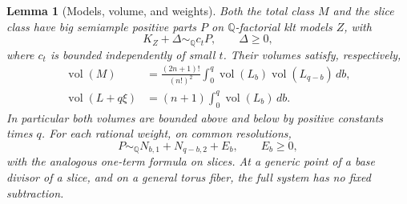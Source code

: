 \documentclass[11pt,letterpaper]{article}
\newcommand{\Q}{\mathbb{Q}}
\DeclareMathOperator{\vol}{vol}
\newtheorem{lemma}[theorem]{Lemma}
\theoremstyle{definition}
\theoremstyle{remark}
\begin{document}
\begin{lemma}[Models, volume, and weights]\label{proj:jet:bundle-models}
Both the total class \(M\) and the slice class have big semiample
positive parts \(P\) on \(\Q\)-factorial klt models \(Z\), with
\[
 K_Z+\Delta\sim_{\Q}c_tP,\qquad \Delta\ge0,
\]
where \(c_t\) is bounded independently of small \(t\).
Their volumes satisfy, respectively,
\begin{align}
 \vol(M)&=\frac{(2n+1)!}{(n!)^2}
   \int_0^q\vol(L_b)\vol(L_{q-b})\,db,\label{proj:jet:total-volume}\\
 \vol(L+q\xi)&=(n+1)\int_0^q\vol(L_b)\,db.\label{proj:jet:slice-volume}
\end{align}
In particular both volumes are bounded above and below by positive
constants times \(q\).  For each rational weight, on common
resolutions,
\begin{equation}\label{proj:jet:weight-domination}
 P\sim_{\Q}N_{b,1}+N_{q-b,2}+E_b,\qquad E_b\ge0,
\end{equation}
with the analogous one-term formula on slices.
At a generic point of a base divisor of a slice, and on a general
torus fiber, the full system has no fixed subtraction.
\end{lemma}
\end{document}
